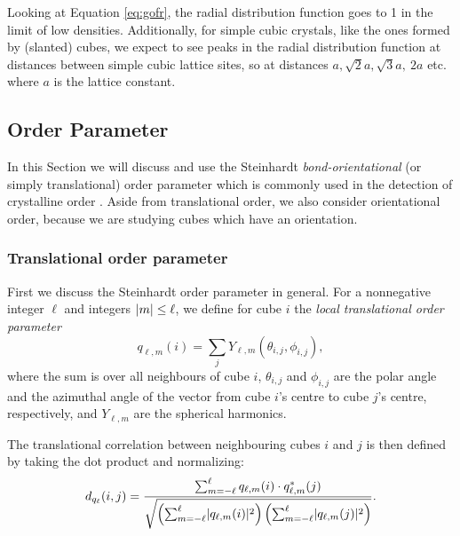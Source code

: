 \documentclass[thesis]{subfiles}
\begin{document}
Looking at Equation \ref{eq:gofr}, the radial distribution function goes to 1 in the limit of low densities. Additionally, for simple cubic crystals, like the ones formed by (slanted) cubes, we expect to see peaks in the radial distribution function at distances between simple cubic lattice sites, so at distances $a, \sqrt 2a, \sqrt 3a,\ 2a$ etc. where $a$ is the lattice constant.

\subsection{Order Parameter} \label{subsec:order}

In this Section we will discuss and use the Steinhardt \emph{bond-orientational} (or simply translational) order parameter which is commonly used in the detection of crystalline order \cite{steinhardt1983bond, lechner2008accurate, van2017phase, sharma2018disorder, mickel2013shortcomings}. Aside from translational order, we also consider orientational order, because we are studying cubes which have an orientation.

\subsubsection{Translational order parameter}

First we discuss the Steinhardt order parameter in general. For a nonnegative integer $\ell$ and integers $\lvert m\rvert \leq\ell$, we define for cube $i$ the \emph{local translational order parameter}
\begin{equation}
q_{\ell, m}(i) = \sum_{j} Y_{\ell, m} (\theta_{i, j}, \phi_{i, j}),
\end{equation}
where the sum is over all neighbours of cube $i$, $\theta_{i, j}$ and $\phi_{i, j}$ are the polar angle and the azimuthal angle of the vector from cube $i$'s centre to cube $j$'s centre, respectively, and $Y_{\ell, m}$ are the spherical harmonics.%

The translational correlation between neighbouring cubes $i$ and $j$ is then defined by taking the dot product and normalizing:
\begin{equation}
d_{q_\ell}(i, j) = \frac{\sum_{m = -\ell}^\ell q_{\ell, m}(i) \cdot q^*_{\ell, m}(j)}{\sqrt{\left(\sum_{m = -\ell}^\ell \lvert q_{\ell, m}(i)\rvert^2\right) \left(\sum_{m = -\ell}^\ell \lvert q_{\ell, m}(j)\rvert^2\right)}}.
\end{equation}
\end{document}

